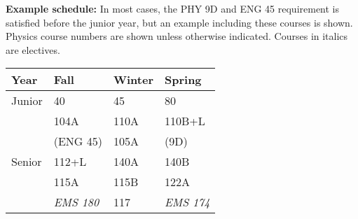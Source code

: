 \documentclass[12pt]{article}
\begin{document}
\noindent
{\bf Example schedule:} In most cases, the PHY 9D and ENG 45 requirement is
satisfied before the junior year, but an example including these courses is
shown.  Physics course numbers are shown unless otherwise indicated.
Courses in italics are electives.
\begin{center}
\begin{tabular}{|l|l|l|l|}
\hline
Year      & Fall    & Winter & Spring \\
\hline
Junior    & 40         & 45           & 80 \\
          & 104A       & 110A         & 110B+L \\
          & (ENG 45)   & 105A         & (9D) \\         
\hline
Senior   & 112+L          & 140A   & 140B \\
         & 115A           & 115B   & 122A \\
         & {\it EMS 180}  & 117   & {\it EMS 174} \\
\hline
\end{tabular}
\end{center}
\end{document}
